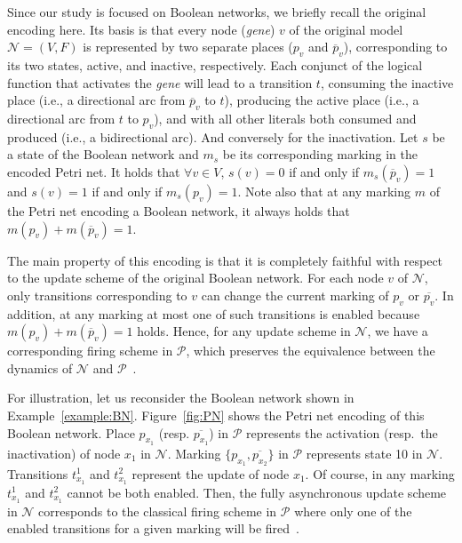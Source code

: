 \documentclass[preprint,12pt]{elsarticle}
\begin{document}
Since our study is focused on Boolean networks, we briefly recall the original encoding here.
Its basis is that every node (\emph{gene}) \(v\) of the original model \(\mathcal{N} = (V, F)\) is represented by two separate places (\(p_v\) and \(\overline{p}_v\)), corresponding to its two states, active, and inactive, respectively.
Each conjunct of the logical function that activates the \emph{gene} will lead to a transition \(t\), consuming the inactive place (i.e., a directional arc from \(\overline{p}_v\) to \(t\)), producing the active place (i.e., a directional arc from \(t\) to \(p_v\)), and with all other literals both consumed and produced (i.e., a bidirectional arc).
And conversely for the inactivation.
Let \(s\) be a state of the Boolean network and \(m_s\) be its corresponding marking in the encoded Petri net. 
It holds that \(\forall v \in V\), \(s(v) = 0\) if and only if \(m_s(\overline{p}_v) = 1\) and \(s(v) = 1\) if and only if \(m_s(p_v) = 1\). Note also that at any marking \(m\) of the Petri net encoding a Boolean network, it always holds that \(m(p_v) + m(\overline{p}_v) = 1\).

The main property of this encoding is that it is completely faithful with respect to the update scheme of the original Boolean network.
For each node \(v\) of \(\mathcal{N}\), only transitions corresponding to \(v\) can change the current marking of \(p_v\) or \(\overline{p_v}\).
In addition, at any marking at most one of such transitions is enabled because \(m(p_v) + m(\overline{p}_v) = 1\) holds.
Hence, for any update scheme in \(\mathcal{N}\), we have a corresponding firing scheme in \(\mathcal{P}\), which preserves the equivalence between the dynamics of \(\mathcal{N}\) and \(\mathcal{P}\)~\cite{DBLP:journals/nc/ChatainHKPT20}.

For illustration, let us reconsider the Boolean network shown in Example~\ref{example:BN}.
Figure~\ref{fig:PN} shows the Petri net encoding of this Boolean network.
Place \(p_{x_1}\) (resp. \(\overline{p_{x_1}}\)) in \(\mathcal{P}\) represents the activation (resp.\ the inactivation) of node \(x_1\) in \(\mathcal{N}\).
Marking \(\{p_{x_1}, \overline{p_{x_2}}\}\) in \(\mathcal{P}\) represents state 10 in \(\mathcal{N}\).
Transitions \(t^{1}_{x_1}\) and \(t^{2}_{x_1}\) represent the update of node \(x_1\).
Of course, in any marking \(t^{1}_{x_1}\) and \(t^{2}_{x_1}\) cannot be both enabled.
Then, the fully asynchronous update scheme in \(\mathcal{N}\) corresponds to the classical firing scheme in \(\mathcal{P}\) where only one of the enabled transitions for a given marking will be fired~\cite{Murata1989}.
\end{document}
